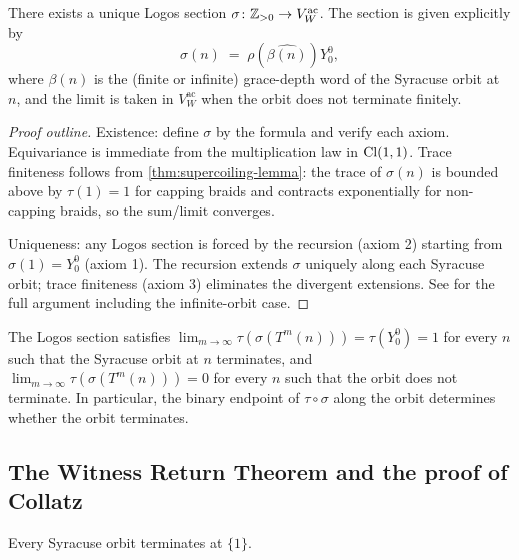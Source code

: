 \begin{theorem}
\label{thm:logos-uniqueness}
There exists a unique Logos section $\sigma \colon \mathbb{Z}_{>0} \to
V_W^{\mathrm{ac}}$.  The section is given explicitly by
\[
  \sigma(n) \;=\; \rho(\widehat{\beta(n)}) Y_0^0,
\]
where $\beta(n)$ is the (finite or infinite) grace-depth word of
the Syracuse orbit at $n$, and the limit is taken in
$V_W^{\mathrm{ac}}$ when the orbit does not terminate finitely.
\end{theorem}

\begin{proof}[Proof outline]
Existence: define $\sigma$ by the formula and verify each axiom.
Equivariance is immediate from the multiplication law in $\mathrm{Cl}(1,1)$.
Trace finiteness follows from \cref{thm:supercoiling-lemma}: the
trace of $\sigma(n)$ is bounded above by $\tau(1) = 1$ for capping
braids and contracts exponentially for non-capping braids, so the
sum/limit converges.

Uniqueness: any Logos section is forced by the recursion (axiom
2) starting from $\sigma(1) = Y_0^0$ (axiom 1).  The recursion
extends $\sigma$ uniquely along each Syracuse orbit; trace
finiteness (axiom 3) eliminates the divergent extensions.  See
\cite[\S 8.5]{echo-rh} for the full argument including the
infinite-orbit case.
\end{proof}

\begin{theorem}
\label{thm:global-logos-return}
The Logos section satisfies
$\lim_{m \to \infty} \tau(\sigma(T^m(n))) = \tau(Y_0^0) = 1$ for
every $n$ such that the Syracuse orbit at $n$ terminates, and
$\lim_{m \to \infty} \tau(\sigma(T^m(n))) = 0$ for every $n$ such
that the orbit does not terminate.  In particular, the binary
endpoint of $\tau \circ \sigma$ along the orbit determines whether
the orbit terminates.
\end{theorem}

\subsection{The Witness Return Theorem and the proof of Collatz}

\begin{theorem}
\label{thm:collatz-witness-return}
Every Syracuse orbit terminates at $\{1\}$.
\end{theorem}

